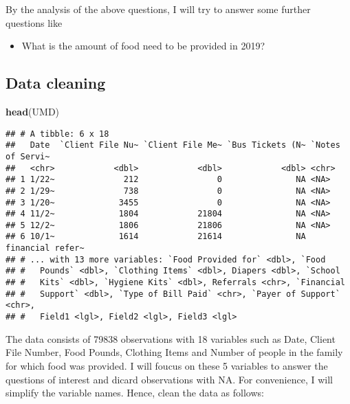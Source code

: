 \documentclass[]{article}
\newenvironment{Shaded}{\begin{snugshade}}{\end{snugshade}}
\newcommand{\KeywordTok}[1]{\textcolor[rgb]{0.13,0.29,0.53}{\textbf{#1}}}
\newcommand{\NormalTok}[1]{#1}
\providecommand{\tightlist}{%
  \setlength{\itemsep}{0pt}\setlength{\parskip}{0pt}}
\begin{document}
By the analysis of the above questions, I will try to answer some
further questions like

\begin{itemize}
\tightlist
\item
  What is the amount of food need to be provided in 2019?
\end{itemize}

\hypertarget{data-cleaning}{%
\subsection{Data cleaning}\label{data-cleaning}}

\begin{Shaded}
\begin{Highlighting}[]
\KeywordTok{head}\NormalTok{(UMD)}
\end{Highlighting}
\end{Shaded}

\begin{verbatim}
## # A tibble: 6 x 18
##   Date  `Client File Nu~ `Client File Me~ `Bus Tickets (N~ `Notes of Servi~
##   <chr>            <dbl>            <dbl>            <dbl> <chr>           
## 1 1/22~              212                0               NA <NA>            
## 2 1/29~              738                0               NA <NA>            
## 3 1/20~             3455                0               NA <NA>            
## 4 11/2~             1804            21804               NA <NA>            
## 5 12/2~             1806            21806               NA <NA>            
## 6 10/1~             1614            21614               NA financial refer~
## # ... with 13 more variables: `Food Provided for` <dbl>, `Food
## #   Pounds` <dbl>, `Clothing Items` <dbl>, Diapers <dbl>, `School
## #   Kits` <dbl>, `Hygiene Kits` <dbl>, Referrals <chr>, `Financial
## #   Support` <dbl>, `Type of Bill Paid` <chr>, `Payer of Support` <chr>,
## #   Field1 <lgl>, Field2 <lgl>, Field3 <lgl>
\end{verbatim}

The data consists of 79838 observations with 18 variables such as Date,
Client File Number, Food Pounds, Clothing Items and Number of people in
the family for which food was provided. I will foucus on these 5
variables to answer the questions of interest and dicard observations
with NA. For convenience, I will simplify the variable names. Hence,
clean the data as follows:
\end{document}
